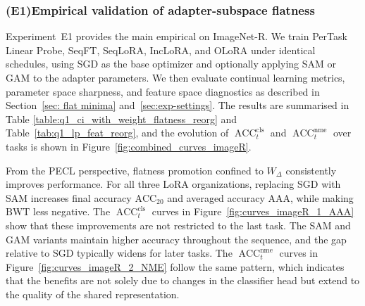 \documentclass[10pt]{article} %
\begin{document}


\subsubsection{(E1)Empirical validation of adapter-subspace flatness}



Experiment~E1 provides the main empirical on ImageNet-R. We train PerTask Linear Probe, SeqFT, SeqLoRA, IncLoRA, and OLoRA under identical schedules, using SGD as the base optimizer and optionally applying SAM or GAM to the adapter parameters. We then evaluate continual learning metrics, parameter space sharpness, and feature space diagnostics as described in Section~\ref{sec: flat minima} and~\ref{sec:exp-settings}. The results are summarised in Table \ref{table:q1_ci_with_weight_flatness_reorg} and Table~\ref{tab:q1_lp_feat_reorg}, and the evolution of $\operatorname{ACC}_t^{\mathrm{cls}}$ and $\operatorname{ACC}_t^{\mathrm{nme}}$ over tasks is shown in Figure~\ref{fig:combined_curves_imageR}.


From the PECL perspective, flatness promotion confined to $W_\Delta$ consistently improves performance. For all three LoRA organizations, replacing SGD with SAM increases final accuracy $\mathrm{ACC}_{20}$ and averaged accuracy $\mathrm{AAA}$, while making $\mathrm{BWT}$ less negative. The $\operatorname{ACC}_t^{\mathrm{cls}}$ curves in Figure~\ref{fig:curves_imageR_1_AAA} show that these improvements are not restricted to the last task. The SAM and GAM variants maintain higher accuracy throughout the sequence, and the gap relative to SGD typically widens for later tasks. The $\operatorname{ACC}_t^{\mathrm{nme}}$ curves in Figure~\ref{fig:curves_imageR_2_NME} follow the same pattern, which indicates that the benefits are not solely due to changes in the classifier head but extend to the quality of the shared representation.
\end{document}
